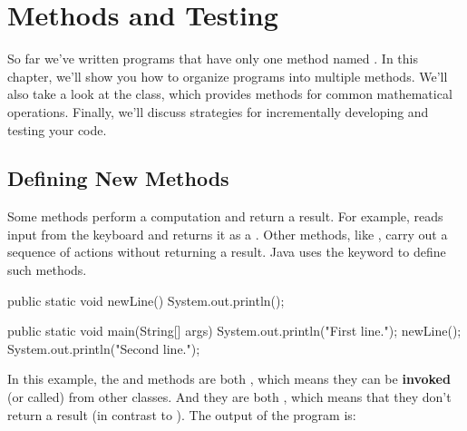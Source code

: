 \chapter{Methods and Testing}

So far we've written programs that have only one method named .
In this chapter, we'll show you how to organize programs into multiple methods.
We'll also take a look at the  class, which provides methods for common mathematical operations.
Finally, we'll discuss strategies for incrementally developing and testing your code.



\section{Defining New Methods}
\label{adding_methods}

Some methods perform a computation and return a result.
For example,  reads input from the keyboard and returns it as a .
Other methods, like , carry out a sequence of actions without returning a result.
Java uses the keyword  to define such methods.


\begin{code}
public static void newLine() {
    System.out.println();
}

public static void main(String[] args) {
    System.out.println("First line.");
    newLine();
    System.out.println("Second line.");
}
\end{code}


In this example, the  and  methods are both , which means they can be {\bf invoked} (or called) from other classes.
And they are both , which means that they don't return a result (in contrast to ).
The output of the program is:

